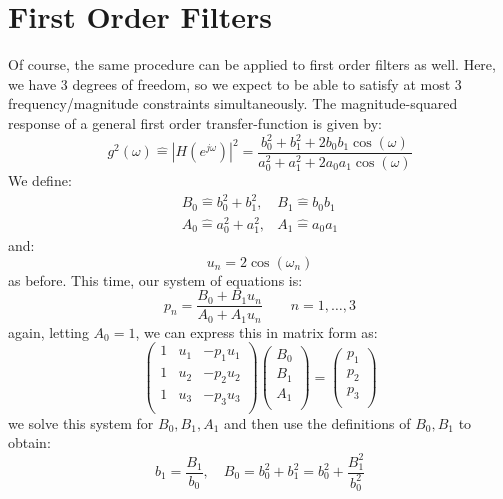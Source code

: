 \section{First Order Filters}
Of course, the same procedure can be applied to first order filters as well. Here, we have 3 degrees of freedom, so we expect to be able to satisfy at most 3 frequency/magnitude constraints simultaneously. The magnitude-squared response of a general first order transfer-function is given by:
\begin{equation}
 g^2(\omega) 
 \hat{=} |H(e^{j \omega})|^2
 = \frac{b_0^2 + b_1^2 + 2 b_0 b_1 \cos(\omega)}
        {a_0^2 + a_1^2 + 2 a_0 a_1 \cos(\omega)}
\end{equation}
We define:
\begin{eqnarray}
 B_0 \hat{=} b_0^2 + b_1^2, & B_1 \hat{=} b_0 b_1 \nonumber\\
 A_0 \hat{=} a_0^2 + a_1^2, & A_1 \hat{=} a_0 a_1 
\end{eqnarray}
and:
\begin{equation}
 u_n = 2 \cos(\omega_n)
\end{equation}
as before. This time, our system of equations is:
\begin{equation}
 p_n = \frac{B_0 + B_1 u_n }
            {A_0 + A_1 u_n } \qquad n = 1, \ldots, 3
\end{equation}
again, letting $A_0 = 1$, we can express this in matrix form as:
\begin{equation}
 \begin{pmatrix}
  1 & u_1 & -p_1 u_1 \\
  1 & u_2 & -p_2 u_2 \\
  1 & u_3 & -p_3 u_3 \\
 \end{pmatrix}
 \begin{pmatrix}
  B_0 \\
  B_1 \\
  A_1 \\
 \end{pmatrix} 
 = 
 \begin{pmatrix}
  p_1 \\
  p_2 \\
  p_3 \\
 \end{pmatrix}  
\end{equation}
we solve this system for $B_0, B_1, A_1$ and then use the definitions of $B_0, B_1$ to obtain:
\begin{equation}
 b_1 = \frac{B_1}{b_0}, \quad B_0 = b_0^2 + b_1^2 = b_0^2 + \frac{B_1^2}{b_0^2}
\end{equation}
